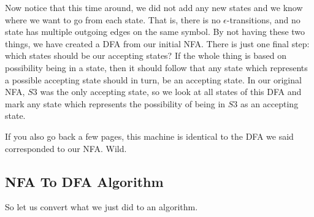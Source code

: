\documentclass[main.tex]{subfiles}
\begin{document}
Now notice that this time around, we did not add any new states and we know where we want to go from each state. That is, there is no $\epsilon$-transitions, and no state has multiple outgoing edges on the same symbol. By not having these two things, we have created a DFA from our initial NFA. There is just one final step: which states should be our accepting states? If the whole thing is based on possibility being in a state, then it should follow that any state which represents a possible accepting state should in turn, be an accepting state. In our original NFA, $S3$ was the only accepting state, so we look at all states of this DFA and mark any state which represents the possibility of being in $S3$ as an accepting state. 
\begin{center}
\end{center}
If you also go back a few pages, this machine is identical to the DFA we said corresponded to our NFA. Wild. 

\subsection{NFA To DFA Algorithm}
So let us convert what we just did to an algorithm.
\end{document}
